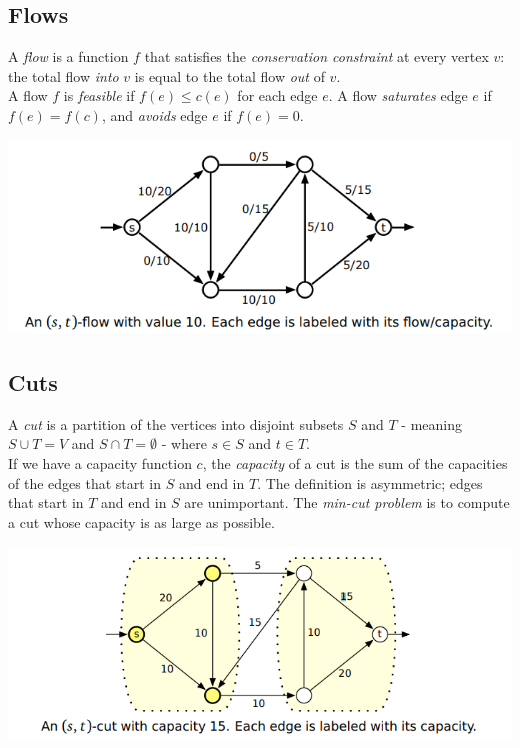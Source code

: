 \subsection{Flows}
A \emph{flow} is a function $f$ that satisfies the \emph{conservation constraint} at every vertex $v$: the total flow \emph{into} $v$ is equal to the total flow \emph{out} of $v$.\\

A flow $f$ is \emph{feasible} if $f(e) \leq c(e)$ for each edge $e$. A flow \emph{saturates} edge $e$ if $f(e) = f(c)$, and \emph{avoids} edge $e$ if $f(e) = 0$.

\includegraphics[width=\linewidth]{images/flow.png}

\subsection{Cuts}
A \emph{cut} is a partition of the vertices into disjoint subsets $S$ and $T$ - meaning $S \cup T = V$ and $S \cap T = \emptyset$ - where $s \in S$ and $t \in T$.\\

If we have a capacity function $c$, the \emph{capacity} of a cut is the sum of the capacities of the edges that start in $S$ and end in $T$. The definition is asymmetric; edges that start in $T$ and end in $S$ are unimportant. The \emph{min-cut problem} is to compute a cut whose capacity is as large as possible.

\includegraphics[width=\linewidth]{images/mincut.png}

